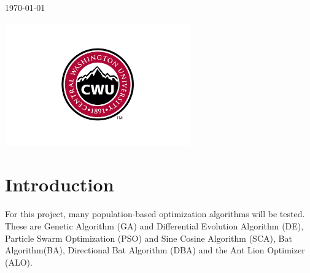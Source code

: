 \documentclass[12pt]{article}
\begin{document}
\begin{titlepage}
        
        \vfill
        
        {\large \today}\\ %
        
        \vfill
        
        \includegraphics[width=8cm]{CWU-Logo.png}\\[.5cm] %
        
        
        \vfill %
        
    \end{titlepage}
    \newpage
    \tableofcontents
    \newpage
    
    
    


\section{Introduction}

For this project, many population-based optimization algorithms will be tested. These are Genetic Algorithm (GA) and Differential Evolution Algorithm (DE), Particle Swarm Optimization (PSO) and Sine Cosine Algorithm (SCA), Bat Algorithm(BA), Directional Bat Algorithm (DBA) and the Ant Lion Optimizer (ALO).
\end{document}
